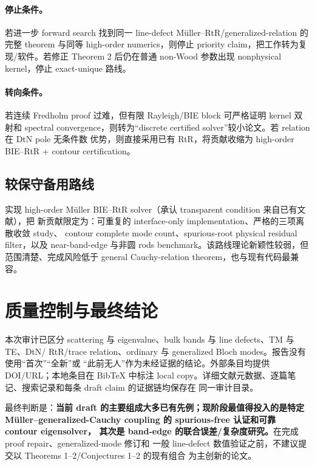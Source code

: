 \documentclass[UTF8,11pt,fontset=none]{ctexart}
\begin{document}
\paragraph{停止条件。}
若进一步 forward search 找到同一 line-defect Müller--RtR/generalized-relation 的完整
theorem 与同等 high-order numerics，则停止 priority claim，把工作转为复现/软件。若修正
Theorem 2 后仍在普通 non-Wood 参数出现 nonphysical kernel，停止 exact-unique 路线。

\paragraph{转向条件。}
若连续 Fredholm proof 过难，但有限 Rayleigh/BIE block 可严格证明 kernel 双射和 spectral
convergence，则转为“discrete certified solver”较小论文。若 relation 在 DtN pole 无条件数
优势，则直接采用已有 RtR，将贡献收缩为 high-order BIE--RtR + contour certification。

\subsection{较保守备用路线}

实现 high-order Müller BIE--RtR solver（承认 transparent condition 来自已有文献），把
新贡献限定为：可重复的 interface-only implementation、严格的三项离散收敛 study、
contour complete mode count、spurious-root physical residual filter，以及 near-band-edge
与非圆 rods benchmark。该路线理论新颖性较弱，但范围清楚、完成风险低于 general
Cauchy-relation theorem，也与现有代码最兼容。

\section{质量控制与最终结论}

本次审计已区分 scattering 与 eigenvalue、bulk bands 与 line defects、TM 与 TE、DtN/
RtR/trace relation、ordinary 与 generalized Bloch modes。报告没有使用“首次”“全新”或
“此前无人”作为未经证据的结论。外部条目均提供 DOI/URL；本地条目在 BibTeX 中标注
local copy。详细文献元数据、逐篇笔记、搜索记录和每条 draft claim 的证据链均保存在
同一审计目录。

最终判断是：\textbf{当前 draft 的主要组成大多已有先例；现阶段最值得投入的是特定
Müller--\allowbreak generalized-Cauchy coupling 的 spurious-free 认证和可靠 contour eigensolver，
其次是 band-edge 的联合误差/复杂度研究。}在完成 proof repair、generalized-mode 修订和
一般 line-defect 数值验证之前，不建议提交以 Theorems 1--2/Conjectures 1--2 的现有组合
为主创新的论文。
\end{document}
